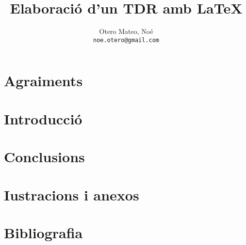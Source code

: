 \documentclass[12pt, oneside]{report}
\title{Elaboració d'un TDR amb \LaTeX{}}
\author{
  Otero Mateo, Noé\\
  \texttt{noe.otero@gmail.com}
}
\begin{document}
\maketitle

\tableofcontents

\renewcommand{\baselinestretch}{1.5}
\setlength{\parskip}{\baselineskip}

\chapter*{Agraiments}


\chapter*{Introducció}


%
%


\chapter{Conclusions}


\chapter{I\lgem ustracions i anexos}

\chapter{Bibliografia}
\end{document}
